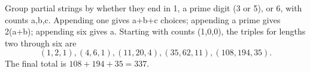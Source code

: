 Group partial strings by whether they end in 1, a prime digit (3 or 5), or 6, with counts a,b,c. Appending one gives a+b+c choices; appending a prime gives 2(a+b); appending six gives a. Starting with counts (1,0,0), the triples for lengths two through six are
\[(1,2,1),(4,6,1),(11,20,4),(35,62,11),(108,194,35).\]
The final total is $108+194+35=\boxed{337}$.
